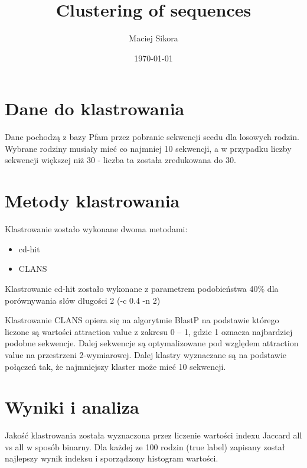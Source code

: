 \documentclass[12pt]{article}
\title{Clustering of sequences}
\author{Maciej Sikora}
\date{\specialdate\today}
\begin{document}
\maketitle

\section{Dane do klastrowania}
Dane pochodzą z bazy Pfam przez pobranie sekwencji seedu dla losowych rodzin.
Wybrane rodziny musiały mieć co najmniej 10 sekwencji, a w przypadku liczby sekwencji większej niż 30 - liczba ta została zredukowana do 30.

\section{Metody klastrowania}
Klastrowanie zostało wykonane dwoma metodami:
\begin{itemize}
\item cd-hit
\item CLANS
\end{itemize}
Klastrowanie cd-hit zostało wykonane z parametrem podobieństwa 40\% dla porównywania słów długości 2 (-c 0.4 -n 2)

Klastrowanie CLANS opiera się na algorytmie BlastP na podstawie którego liczone są wartości attraction value z zakresu 0 -- 1, gdzie 1 oznacza najbardziej podobne sekwencje. Dalej sekwencje są optymalizowane pod względem attraction value na przestrzeni 2-wymiarowej. Dalej klastry wyznaczane są na podstawie połączeń tak, że najmniejszy klaster może mieć 10 sekwencji.

\section{Wyniki i analiza}
Jakość klastrowania została wyznaczona przez liczenie wartości indexu Jaccard all vs all w sposób binarny.
Dla każdej ze 100 rodzin (true label) zapisany został najlepszy wynik indeksu i sporządzony histogram wartości.
\end{document}
